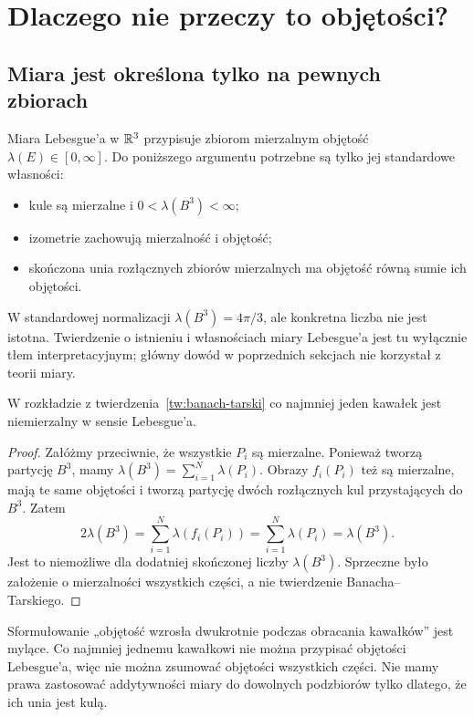 \section{Dlaczego nie przeczy to objętości?}
\subsection{Miara jest określona tylko na pewnych zbiorach}
Miara Lebesgue'a w $\mathbb R^3$ przypisuje zbiorom mierzalnym objętość $\lambda(E)\in[0,\infty]$. Do poniższego argumentu potrzebne są tylko jej standardowe własności:
\begin{itemize}
\item kule są mierzalne i $0<\lambda(B^3)<\infty$;
\item izometrie zachowują mierzalność i objętość;
\item skończona unia rozłącznych zbiorów mierzalnych ma objętość równą sumie ich objętości.
\end{itemize}
W standardowej normalizacji $\lambda(B^3)=4\pi/3$, ale konkretna liczba nie jest istotna. Twierdzenie o istnieniu i własnościach miary Lebesgue'a jest tu wyłącznie tłem interpretacyjnym; główny dowód w poprzednich sekcjach nie korzystał z teorii miary.
\begin{stwierdzenie}\label{st:niemierzalnosc}
W rozkładzie z twierdzenia~\ref{tw:banach-tarski} co najmniej jeden kawałek jest niemierzalny w sensie Lebesgue'a.
\end{stwierdzenie}
\begin{proof}
Załóżmy przeciwnie, że wszystkie $P_i$ są mierzalne. Ponieważ tworzą partycję $B^3$, mamy $\lambda(B^3)=\sum_{i=1}^{N}\lambda(P_i)$. Obrazy $f_i(P_i)$ też są mierzalne, mają te same objętości i tworzą partycję dwóch rozłącznych kul przystających do $B^3$. Zatem
\[
 2\lambda(B^3)=\sum_{i=1}^{N}\lambda(f_i(P_i))=
 \sum_{i=1}^{N}\lambda(P_i)=\lambda(B^3).
\]
Jest to niemożliwe dla dodatniej skończonej liczby $\lambda(B^3)$. Sprzeczne było założenie o mierzalności wszystkich części, a nie twierdzenie Banacha--Tarskiego.
\end{proof}
\begin{uwaga}
Sformułowanie „objętość wzrosła dwukrotnie podczas obracania kawałków” jest mylące. Co najmniej jednemu kawałkowi nie można przypisać objętości Lebesgue'a, więc nie można zsumować objętości wszystkich części. Nie mamy prawa zastosować addytywności miary do dowolnych podzbiorów tylko dlatego, że ich unia jest kulą.
\end{uwaga}

